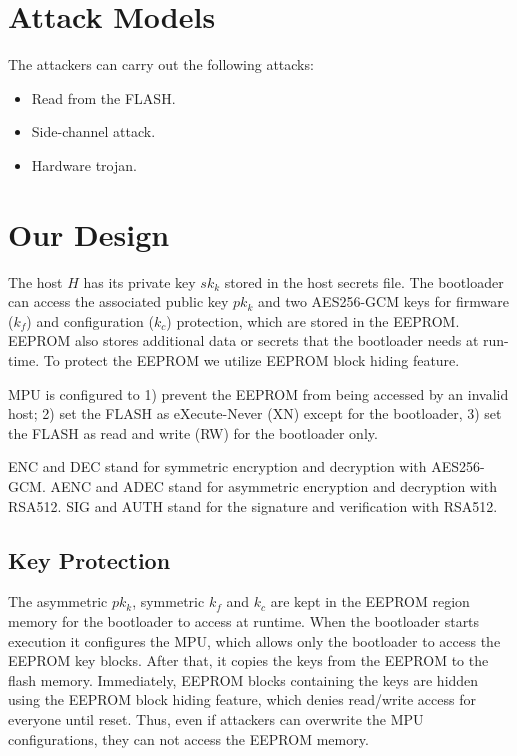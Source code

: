 \documentclass[11pt,oneside,onecolumn,letterpaper]{article}
\begin{document}
\section{Attack Models}

The attackers can carry out the following attacks:

\begin{itemize}
  \item Read from the FLASH.
  \item Side-channel attack.
  \item Hardware trojan.
\end{itemize}


\section{Our Design}

The host $H$ has its private key $sk_k$ stored in the host secrets file.
The bootloader can access the associated public key $pk_k$ and two AES256-GCM keys for firmware ($k_f$) and configuration ($k_c$) protection, which are stored in the EEPROM.
EEPROM also stores additional data or secrets that the bootloader needs at run-time.
To protect the EEPROM we utilize EEPROM block hiding feature.

MPU is configured to 1) prevent the EEPROM from being accessed by an invalid host; 2) set the FLASH as eXecute-Never (XN) except for the bootloader, 3) set the FLASH as read and write (RW) for the bootloader only. 

ENC and DEC stand for symmetric encryption and decryption with AES256-GCM.
AENC and ADEC stand for asymmetric encryption and decryption with RSA512.
SIG and AUTH stand for the signature and verification with RSA512.

\subsection{Key Protection}
The asymmetric $pk_k$, symmetric $k_f$ and $k_c$ are kept in the EEPROM region memory for the bootloader to access at runtime.
When the bootloader starts execution it configures the MPU, which allows only the bootloader to access the EEPROM key blocks.
After that, it copies the keys from the EEPROM to the flash memory.
Immediately, EEPROM blocks containing the keys are hidden using the EEPROM block hiding feature, which denies read/write access for everyone until reset.
Thus, even if attackers can overwrite the MPU configurations, they can not access the EEPROM memory.
\end{document}
